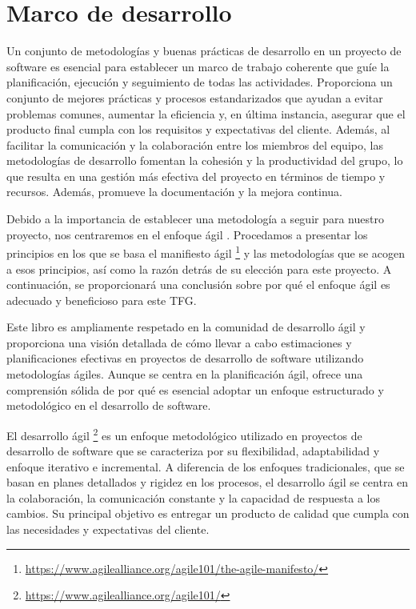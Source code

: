 \section{Marco de desarrollo}

Un conjunto de metodologías y buenas prácticas de desarrollo en un proyecto de software es esencial 
para establecer un marco de trabajo coherente que guíe la planificación, ejecución y seguimiento de 
todas las actividades. Proporciona un conjunto de mejores prácticas y procesos estandarizados que 
ayudan a evitar problemas comunes, aumentar la eficiencia y, en última instancia, asegurar que el 
producto final cumpla con los requisitos y expectativas del cliente. Además, al facilitar la 
comunicación y la colaboración entre los miembros del equipo, las metodologías de desarrollo fomentan 
la cohesión y la productividad del grupo, lo que resulta en una gestión más efectiva del proyecto en 
términos de tiempo y recursos. Además, promueve la documentación y la mejora continua.

Debido a la importancia de establecer una metodología a seguir para nuestro proyecto, nos centraremos 
en el enfoque ágil \cite{WhyAgile}. Procedamos a presentar los principios en los que se basa el 
manifiesto ágil \footnote{\url{https://www.agilealliance.org/agile101/the-agile-manifesto/}} y las 
metodologías que se acogen a esos principios, así como la razón detrás de su elección para este 
proyecto. A continuación, se proporcionará una conclusión sobre por qué el enfoque ágil es adecuado y 
beneficioso para este TFG.

Este libro\cite{MetodDesa} es ampliamente respetado en la comunidad de desarrollo ágil y proporciona 
una visión detallada de cómo llevar a cabo estimaciones y planificaciones efectivas en proyectos de 
desarrollo de software utilizando metodologías ágiles. Aunque se centra en la planificación ágil, 
ofrece una comprensión sólida de por qué es esencial adoptar un enfoque estructurado y metodológico en 
el desarrollo de software.

El desarrollo ágil \footnote{\url{https://www.agilealliance.org/agile101/}} es un enfoque metodológico 
utilizado en proyectos de desarrollo de software que se caracteriza por su flexibilidad, adaptabilidad 
y enfoque iterativo e incremental. A diferencia de los enfoques tradicionales, que se basan en planes 
detallados y rigidez en los procesos, el desarrollo ágil se centra en la colaboración, la comunicación 
constante y la capacidad de respuesta a los cambios. Su principal objetivo es entregar un producto de 
calidad que cumpla con las necesidades y expectativas del cliente.


